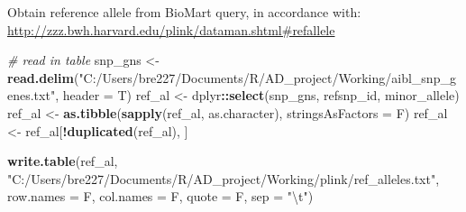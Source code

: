 \documentclass[]{article}
\newenvironment{Shaded}{\begin{snugshade}}{\end{snugshade}}
\newcommand{\KeywordTok}[1]{\textcolor[rgb]{0.13,0.29,0.53}{\textbf{#1}}}
\newcommand{\DataTypeTok}[1]{\textcolor[rgb]{0.13,0.29,0.53}{#1}}
\newcommand{\CharTok}[1]{\textcolor[rgb]{0.31,0.60,0.02}{#1}}
\newcommand{\StringTok}[1]{\textcolor[rgb]{0.31,0.60,0.02}{#1}}
\newcommand{\CommentTok}[1]{\textcolor[rgb]{0.56,0.35,0.01}{\textit{#1}}}
\newcommand{\ControlFlowTok}[1]{\textcolor[rgb]{0.13,0.29,0.53}{\textbf{#1}}}
\newcommand{\OperatorTok}[1]{\textcolor[rgb]{0.81,0.36,0.00}{\textbf{#1}}}
\newcommand{\NormalTok}[1]{#1}
\begin{document}
\begin{Shaded}
\end{Shaded}

Obtain reference allele from BioMart query, in accordance with:
\url{http://zzz.bwh.harvard.edu/plink/dataman.shtml\#refallele}

\begin{Shaded}
\begin{Highlighting}[]
\CommentTok{# read in table}
\NormalTok{snp_gns <-}\StringTok{ }\KeywordTok{read.delim}\NormalTok{(}\StringTok{"C:/Users/bre227/Documents/R/AD_project/Working/aibl_snp_genes.txt"}\NormalTok{, }\DataTypeTok{header =}\NormalTok{ T)}
\NormalTok{ref_al <-}\StringTok{ }\NormalTok{dplyr}\OperatorTok{::}\KeywordTok{select}\NormalTok{(snp_gns, refsnp_id, minor_allele)}
\NormalTok{ref_al <-}\StringTok{ }\KeywordTok{as.tibble}\NormalTok{(}\KeywordTok{sapply}\NormalTok{(ref_al, as.character), }\DataTypeTok{stringsAsFactors =}\NormalTok{ F)}
\NormalTok{ref_al <-}\StringTok{ }\NormalTok{ref_al[}\OperatorTok{!}\KeywordTok{duplicated}\NormalTok{(ref_al), ]}

\KeywordTok{write.table}\NormalTok{(ref_al, }\StringTok{"C:/Users/bre227/Documents/R/AD_project/Working/plink/ref_alleles.txt"}\NormalTok{, }\DataTypeTok{row.names =}\NormalTok{ F, }\DataTypeTok{col.names =}\NormalTok{ F, }\DataTypeTok{quote =}\NormalTok{ F, }\DataTypeTok{sep =} \StringTok{"}\CharTok{\textbackslash{}t}\StringTok{"}\NormalTok{)}
\end{Highlighting}
\end{Shaded}
\end{document}
